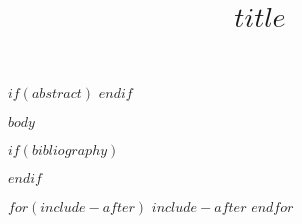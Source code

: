 \documentclass[letterpaper,twocolumn]{article}
\title{$title$}
\begin{document}
\maketitle
$if(abstract)$
$endif$

$body$

$if(bibliography)$

$endif$

$for(include-after)$
$include-after$
$endfor$
\end{document}
